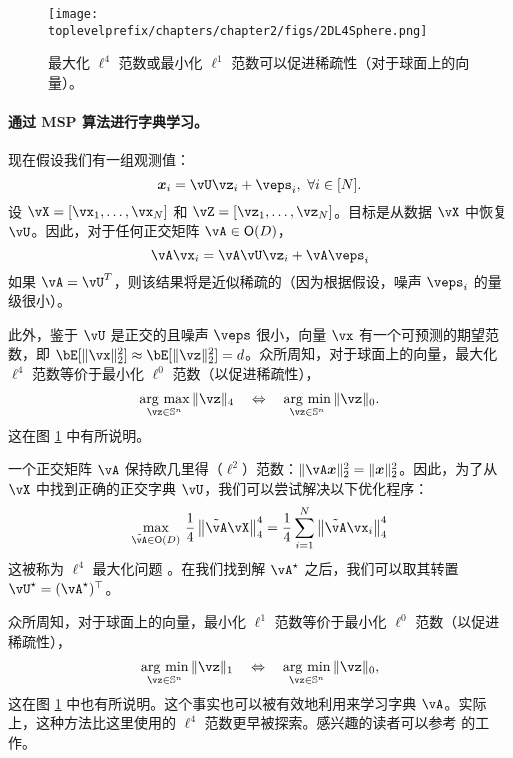 \documentclass[../../book-main.tex]{subfiles}
\begin{document}
\begin{figure}
    \centering
    \texttt{[image: \\toplevelprefix/chapters/chapter2/figs/2DL4Sphere.png]}\vspace{-0.1in}
    \caption{最大化 $\ell^4$ 范数或最小化 $\ell^1$ 范数可以促进稀疏性（对于球面上的向量）。}
    \label{fig:L4-sphere}
\end{figure}


\paragraph{通过 MSP 算法进行字典学习。}

现在假设我们有一组观测值：
\begin{equation}
    \x_i = \vU \vz_i + \veps_i,\ \forall i \in [N].
\end{equation}
设 $\vX = [\vx_1, \dots, \vx_N]$ 和 $\vZ = [\vz_1, \dots, \vz_N]$。目标是从数据 $\vX$ 中恢复 $\vU$。因此，对于任何正交矩阵 $\vA \in \O(D)$，
\begin{equation}
    \vA\vx_i = \vA\vU \vz_i + \vA\veps_i
\end{equation}
如果 $\vA = \vU^T$，则该结果将是近似稀疏的（因为根据假设，噪声 $\veps_i$ 的量级很小）。

此外，鉴于 $\vU$ 是正交的且噪声 $\veps$ 很小，向量 $\vx$ 有一个可预测的期望范数，即 $\bE[\norm{\vx}_2^2] \approx \bE[\norm{\vz}_2^2]=d$。众所周知，对于球面上的向量，最大化 $\ell^4$ 范数等价于最小化 $\ell^0$ 范数（以促进稀疏性），
\begin{equation}
    \argmax_{\vz \in \mathbb{S}^n}\|\vz\|_{4}\quad\Leftrightarrow\quad \argmin_{\vz \in \mathbb{S}^n}\|\vz\|_{0}.
\end{equation}
这在图 \ref{fig:L4-sphere} 中有所说明。

一个正交矩阵 $\vA$ 保持欧几里得（\(\ell^{2}\)）范数：$\|\vA \x\|_2^2 = \|\x\|_2^2$。因此，为了从 $\vX$ 中找到正确的正交字典 $\vU$，我们可以尝试解决以下优化程序：
\begin{equation}\label{eq0:orthogonal-dictionary-learning-l4}
    \max_{\tilde{\vA} \in \O(D)}\,
     \frac{1}{4} \norm*{
    \tilde{\vA} \vX
    }_4^4 =  \frac{1}{4} \sum_{i=1}^N \norm*{
        \tilde{\vA} \vx_i
    }_4^4
\end{equation}
这被称为 $\ell^4$ 最大化问题 \cite{Zhai-2020}。在我们找到解 \(\vA^{\star}\) 之后，我们可以取其转置 \(\vU^{\star} = (\vA^{\star})^{\top}\)。
\begin{remark}
    众所周知，对于球面上的向量，最小化 $\ell^1$ 范数等价于最小化 $\ell^0$ 范数（以促进稀疏性），
\begin{equation*}
            \argmin_{\vz \in \mathbb{S}^n}\|\vz\|_{1}\quad\Leftrightarrow\quad \argmin_{\vz \in \mathbb{S}^n}\|\vz\|_{0},
\end{equation*}
这在图 \ref{fig:L4-sphere} 中也有所说明。这个事实也可以被有效地利用来学习字典 $\vA$。实际上，这种方法比这里使用的 $\ell^4$ 范数更早被探索。感兴趣的读者可以参考 \cite{qu2020findingsparsestvectorssubspace} 的工作。
\end{remark}
\end{document}
